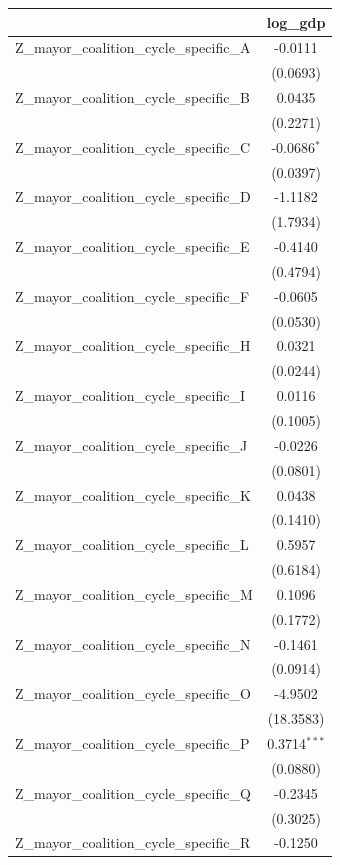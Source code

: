 \begin{tabular}{lc}
\toprule
 & log\_gdp \\
\midrule
Z\_mayor\_coalition\_cycle\_specific\_A & -0.0111 \\
 & (0.0693) \\
Z\_mayor\_coalition\_cycle\_specific\_B & 0.0435 \\
 & (0.2271) \\
Z\_mayor\_coalition\_cycle\_specific\_C & -0.0686$^{*}$ \\
 & (0.0397) \\
Z\_mayor\_coalition\_cycle\_specific\_D & -1.1182 \\
 & (1.7934) \\
Z\_mayor\_coalition\_cycle\_specific\_E & -0.4140 \\
 & (0.4794) \\
Z\_mayor\_coalition\_cycle\_specific\_F & -0.0605 \\
 & (0.0530) \\
Z\_mayor\_coalition\_cycle\_specific\_H & 0.0321 \\
 & (0.0244) \\
Z\_mayor\_coalition\_cycle\_specific\_I & 0.0116 \\
 & (0.1005) \\
Z\_mayor\_coalition\_cycle\_specific\_J & -0.0226 \\
 & (0.0801) \\
Z\_mayor\_coalition\_cycle\_specific\_K & 0.0438 \\
 & (0.1410) \\
Z\_mayor\_coalition\_cycle\_specific\_L & 0.5957 \\
 & (0.6184) \\
Z\_mayor\_coalition\_cycle\_specific\_M & 0.1096 \\
 & (0.1772) \\
Z\_mayor\_coalition\_cycle\_specific\_N & -0.1461 \\
 & (0.0914) \\
Z\_mayor\_coalition\_cycle\_specific\_O & -4.9502 \\
 & (18.3583) \\
Z\_mayor\_coalition\_cycle\_specific\_P & 0.3714$^{***}$ \\
 & (0.0880) \\
Z\_mayor\_coalition\_cycle\_specific\_Q & -0.2345 \\
 & (0.3025) \\
Z\_mayor\_coalition\_cycle\_specific\_R & -0.1250 \\

\end{tabular}
